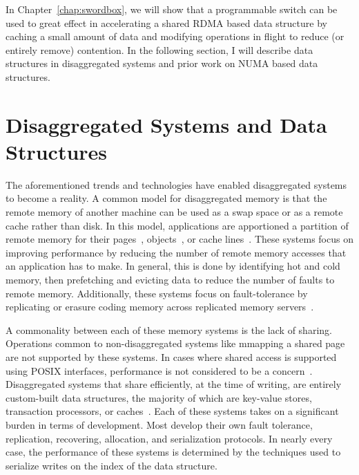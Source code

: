 \documentclass[12pt]{ucsddissertation}
\begin{document}
In Chapter~\ref{chap:swordbox}, we will show that a programmable switch can be used to great effect
in accelerating a shared RDMA based data structure by caching a small amount of data and modifying
operations in flight to reduce (or entirely remove) contention. In the following section, I will
describe data structures in disaggregated systems and prior work on NUMA based data structures.




\section{Disaggregated Systems and Data Structures}
\label{sec:disaggregated-data-structures}


The aforementioned trends and technologies have enabled disaggregated systems to become a reality. A
common model for disaggregated memory is that the remote memory of another machine can be used as a
swap space or as a remote cache rather than disk. In this model, applications are apportioned a
partition of remote memory for their
pages~\cite{infiniswap,fastswap,leap,blade-server,legoos,hydra}, objects~\cite{aifm,carbink}, or
cache lines~\cite{kona}. These systems focus on improving performance by reducing the number of
remote memory accesses that an application has to make. In general, this is done by identifying hot
and cold memory, then prefetching and evicting data to reduce the number of faults to remote memory.
Additionally, these systems focus on fault-tolerance by replicating or erasure coding memory across
replicated memory servers~\cite{hydra}.

A commonality between each of these memory systems is the lack of sharing. Operations common to
non-disaggregated systems like mmapping a shared page are not supported by these systems. In cases
where shared access is supported using POSIX interfaces, performance is not considered to be a
concern~\cite{Regions}. Disaggregated systems that share efficiently, at the time of writing, are
entirely custom-built data structures, the majority of which are key-value stores, transaction
processors, or caches~\cite{clover, sherman, race, fusee, rolex, ford, ditto}. Each of these systems
takes on a significant burden in terms of development. Most develop their own fault tolerance,
replication, recovering, allocation, and serialization protocols. In nearly every case, the
performance of these systems is determined by the techniques used to serialize writes on the index
of the data structure.
\end{document}
